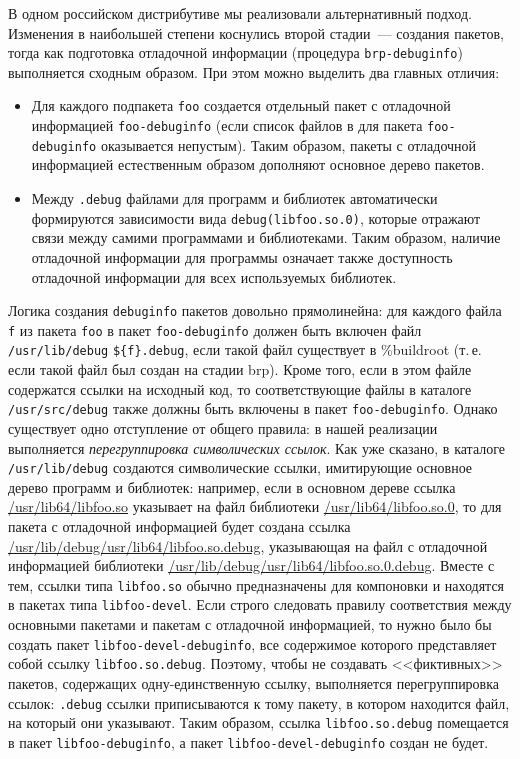 \documentclass[russian,a4paper,12pt,titlepage]{article}
\begin{document}
В одном российском дистрибутиве мы реализовали альтернативный подход.  Изменения в наибольшей степени коснулись второй стадии~---
создания пакетов, тогда как подготовка отладочной информации (процедура \verb|brp-debuginfo|) выполняется сходным образом.
При этом можно выделить два главных отличия:
\begin{itemize}
\item Для каждого подпакета \verb|foo| создается отдельный пакет с отладочной информацией \verb|foo-debuginfo| (если список
файлов в для пакета \verb|foo-debuginfo| оказывается непустым).  Таким образом, пакеты с отладочной информацией естественным
образом дополняют основное дерево пакетов.
\item Между \verb|.debug| файлами для программ и библиотек автоматически формируются зависимости вида \verb|debug(libfoo.so.0)|,
которые отражают связи между самими программами и библиотеками.  Таким образом, наличие отладочной информации для программы означает
также доступность отладочной информации для всех используемых библиотек.
\end{itemize}

Логика создания \verb|debuginfo| пакетов довольно прямолинейна: для каждого файла \verb|f| из пакета \verb|foo|
в пакет \verb|foo-debuginfo| должен быть включен файл \verb|/usr/lib/debug| \verb|${f}.debug|,
если такой файл существует в \%buildroot (т.\,е. если такой файл был создан на стадии brp).
Кроме того, если в этом файле содержатся ссылки на исходный код, то соответствующие файлы в каталоге
\verb|/usr/src/debug| также должны быть включены в пакет \verb|foo-debuginfo|.  Однако существует
одно отступление от общего правила: в нашей реализации выполняется \emph{перегруппировка символических ссылок}.
Как уже сказано, в каталоге \verb|/usr/lib/debug| создаются символические ссылки, имитирующие основное дерево
программ и библиотек: например, если в основном дереве ссылка \url{/usr/lib64/libfoo.so} указывает на файл
библиотеки \url{/usr/lib64/libfoo.so.0}, то для пакета с отладочной информацией будет создана ссылка
\url{/usr/lib/debug/usr/lib64/libfoo.so.debug}, указывающая на файл с отладочной информацией библиотеки
\url{/usr/lib/debug/usr/lib64/libfoo.so.0.debug}.  Вместе с тем, ссылки типа \verb|libfoo.so| обычно
предназначены для компоновки и находятся в пакетах типа \verb|libfoo-devel|.  Если строго следовать
правилу соответствия между основными пакетами и пакетам с отладочной информацией, то нужно было бы создать
пакет \verb|libfoo-devel-debuginfo|, все содержимое которого представляет собой ссылку \verb|libfoo.so.debug|.
Поэтому, чтобы не создавать <<фиктивных>> пакетов, содержащих одну-единственную
ссылку, выполняется перегруппировка ссылок: \verb|.debug| ссылки приписываются к тому пакету, в котором
находится файл, на который они указывают.  Таким образом, ссылка \verb|libfoo.so.debug| помещается в пакет
\verb|libfoo-debuginfo|, а пакет \verb|libfoo-devel-debuginfo| создан не будет.
\end{document}

